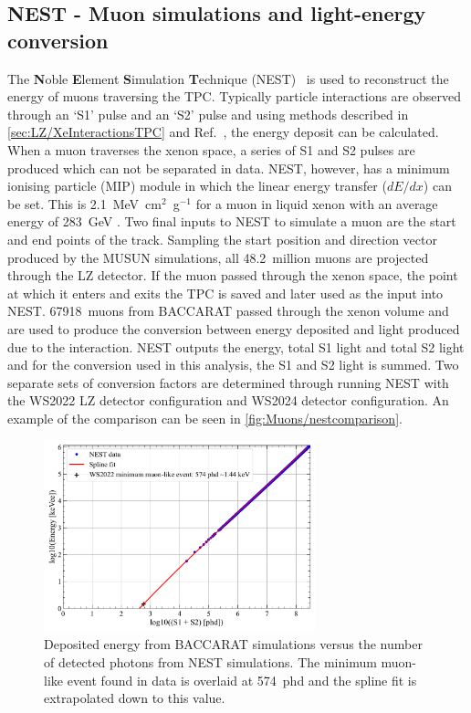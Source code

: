 \subsection{NEST - Muon simulations and light-energy conversion}\label{sec:Muons/MuonFluxNEST}
The \textbf{N}oble \textbf{E}lement \textbf{S}imulation \textbf{T}echnique (NEST)~\cite{NEST2011} is used to reconstruct the energy of muons traversing the TPC. Typically particle interactions are observed through an `S1' pulse and an `S2' pulse and using methods described in \autoref{sec:LZ/XeInteractionsTPC} and Ref.~\cite{NEST2011}, the energy deposit can be calculated. When a muon traverses the xenon space, a series of S1 and S2 pulses are produced which can not be separated in data. NEST, however, has a minimum ionising particle (MIP) module in which the linear energy transfer ($dE/dx$) can be set. This is 2.1~MeV~cm$^2$~g$^{-1}$ for a muon in liquid xenon with an average energy of 283~GeV \cite{MUE}. Two final inputs to NEST to simulate a muon are the start and end points of the track.
Sampling the start position and direction vector produced by the MUSUN simulations, all 48.2~million muons are projected through the LZ detector. If the muon passed through the xenon space, the point at which it enters and exits the TPC is saved and later used as the input into NEST. 67918~muons from BACCARAT passed through the xenon volume and are used to produce the conversion between energy deposited and light produced due to the interaction. NEST outputs the energy, total S1 light and total S2 light and for the conversion used in this analysis, the S1 and S2 light is summed.
Two separate sets of conversion factors are determined through running NEST with the WS2022 LZ detector configuration and WS2024 detector configuration. An example of the comparison can be seen in \autoref{fig:Muons/nestcomparison}.
\begin{figure}[h!]
    \centering
    \includegraphics[width=0.7\textwidth]{figures/Muons/TPCEnergyConversion.pdf}
    \caption[Deposited energy from BACCARAT simulations versus the number of detected photons from NEST simulations.]{Deposited energy from BACCARAT simulations versus the number of detected photons from NEST simulations. The minimum muon-like event found in data is overlaid at 574~phd and the spline fit is extrapolated down to this value.}
    \label{fig:Muons/nestcomparison}
\end{figure}
